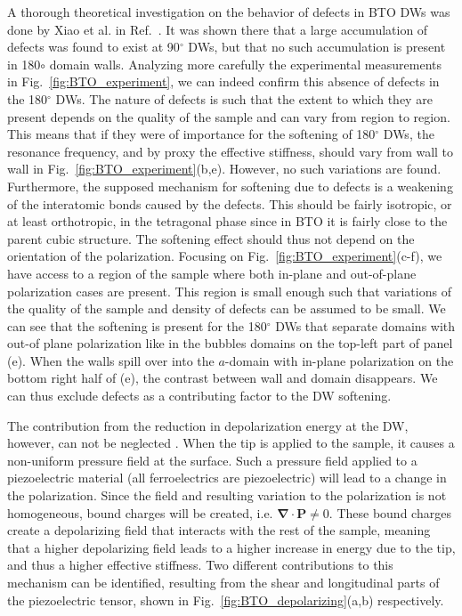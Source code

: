 A thorough theoretical investigation on the behavior of defects in BTO DWs was done by Xiao et al. in Ref.~\cite{Xiao2005}.
It was shown there that a large accumulation of defects was found to exist at 90$^\circ$ DWs, but that no such accumulation is present in 180$\circ$ domain walls.
Analyzing more carefully the experimental measurements in Fig.~\ref{fig:BTO_experiment}, we can indeed confirm this absence of defects in the 180$^\circ$ DWs.
The nature of defects is such that the extent to which they are present depends on the quality of the sample and can vary from region to region.
This means that if they were of importance for the softening of 180$^\circ$ DWs, the resonance frequency, and by proxy the effective stiffness, should vary from wall to wall in Fig.~\ref{fig:BTO_experiment}(b,e).
However, no such variations are found.
Furthermore, the supposed mechanism for softening due to defects is a weakening of the interatomic bonds caused by the defects.
This should be fairly isotropic, or at least orthotropic, in the tetragonal phase since in BTO it is fairly close to the parent cubic structure.
The softening effect should thus not depend on the orientation of the polarization.
Focusing on Fig.~\ref{fig:BTO_experiment}(c-f), we have access to a region of the sample where both in-plane and out-of-plane polarization cases are present.
This region is small enough such that variations of the quality of the sample and density of defects can be assumed to be small.
We can see that the softening is present for the 180$^\circ$ DWs that separate domains with out-of plane polarization like in the bubbles domains on the top-left part of panel (e).
When the walls spill over into the $a$-domain with in-plane polarization on the bottom right half of (e), the contrast between wall and domain disappears.
We can thus exclude defects as a contributing factor to the DW softening.

The contribution from the reduction in depolarization energy at the DW, however, can not be neglected \cite{Tsuji2005,Stefani2020}.
When the tip is applied to the sample, it causes a non-uniform pressure field at the surface.
Such a pressure field applied to a piezoelectric material (all ferroelectrics are piezoelectric) will lead to a change in the polarization.
Since the field and resulting variation to the polarization is not homogeneous, bound charges will be created, i.e. $\bm{\nabla} \cdot \bm{P} \neq 0$.
These bound charges create a depolarizing field that interacts with the rest of the sample, meaning that a higher depolarizing field leads to a higher increase in energy due to the tip, and thus a higher effective stiffness.
Two different contributions to this mechanism can be identified, resulting from the shear and longitudinal parts of the piezoelectric tensor, shown in Fig.~\ref{fig:BTO_depolarizing}(a,b) respectively.


